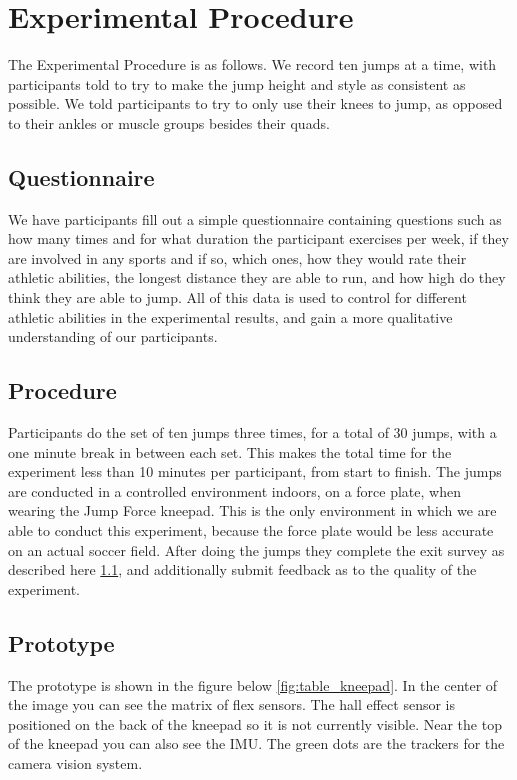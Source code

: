 \documentclass[manuscript,screen,review]{acmart}
\begin{document}
\section{Experimental Procedure}

The Experimental Procedure is as follows. We record ten jumps at a time, with participants told to try to make the jump height and style as consistent as possible. We told participants to try to only use their knees to jump, as opposed to their ankles or muscle groups besides their quads.

\subsection{Questionnaire} \label{sec:questionnaire}

We have participants fill out a simple questionnaire containing questions such as how many times and for what duration the participant exercises per week, if they are involved in any sports and if so, which ones, how they would rate their athletic abilities, the longest distance they are able to run, and how high do they think they are able to jump. All of this data is used to control for different athletic abilities in the experimental results, and gain a more qualitative understanding of our participants.

\subsection{Procedure} \label{sec:procedure}

Participants do the set of ten jumps three times, for a total of 30 jumps, with a one minute break in between each set. This makes the total time for the experiment less than 10 minutes per participant, from start to finish. The jumps are conducted in a controlled environment indoors, on a force plate, when wearing the Jump Force kneepad. This is the only environment in which we are able to conduct this experiment, because the force plate would be less accurate on an actual soccer field. After doing the jumps they complete the exit survey as described here \ref{sec:questionnaire}, and additionally submit feedback as to the quality of the experiment.

\subsection{Prototype}

The prototype is shown in the figure below \ref{fig:table_kneepad}. In the center of the image you can see the matrix of flex sensors. The hall effect sensor is positioned on the back of the kneepad so it is not currently visible. Near the top of the kneepad you can also see the IMU. The green dots are the trackers for the camera vision system.
\end{document}
